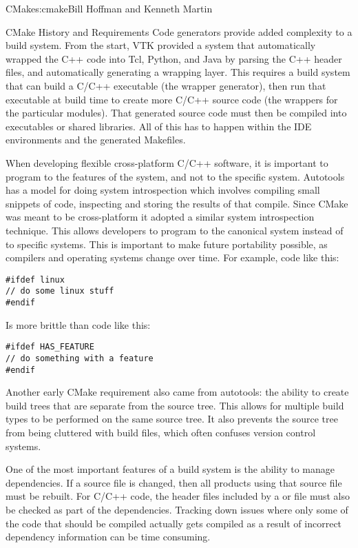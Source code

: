 \begin{aosachapter}{CMake}{s:cmake}{Bill Hoffman and Kenneth Martin}
\begin{aosasect1}{CMake History and Requirements}
Code generators provide added complexity to a build system.  From the
start, VTK provided a system that automatically wrapped the
C++ code into Tcl, Python, and Java by
parsing the C++ header files, and automatically generating a wrapping
layer.  This requires a build system that can build a C/C++ executable
(the wrapper generator), then run that executable at build time to
create more C/C++ source code (the wrappers for the particular
modules).  That generated source code must then be compiled into
executables or shared libraries. All of this has to happen within the
IDE environments and the generated Makefiles.

When developing flexible cross-platform C/C++ software, it is
important to program to the features of the system, and not to the
specific system. Autotools has a model for doing system introspection
which involves compiling small snippets of code, inspecting and
storing the results of that compile. Since CMake was meant to be
cross-platform it adopted a similar system introspection technique.
This allows developers to program to the canonical system instead of
to specific systems. This is important to make future portability
possible, as compilers and operating systems change over time.  For
example, code like this:

\begin{verbatim}
#ifdef linux
// do some linux stuff
#endif
\end{verbatim}

\noindent Is more brittle than code like this:

\begin{verbatim}
#ifdef HAS_FEATURE
// do something with a feature
#endif
\end{verbatim}

Another early CMake requirement also came from autotools: the ability
to create build trees that are separate from the source tree. This
allows for multiple build types to be performed on the same source
tree. It also prevents the source tree from being cluttered with build
files, which often confuses version control systems.

One of the most important features of a build system is the ability to
manage dependencies. If a source file is changed, then all products
using that source file must be rebuilt. For C/C++ code, the header
files included by a  or  file must also be checked
as part of the dependencies.  Tracking down issues where only some of
the code that should be compiled actually gets compiled as a result of
incorrect dependency information can be time consuming.


\end{aosasect1}
\end{aosachapter}
